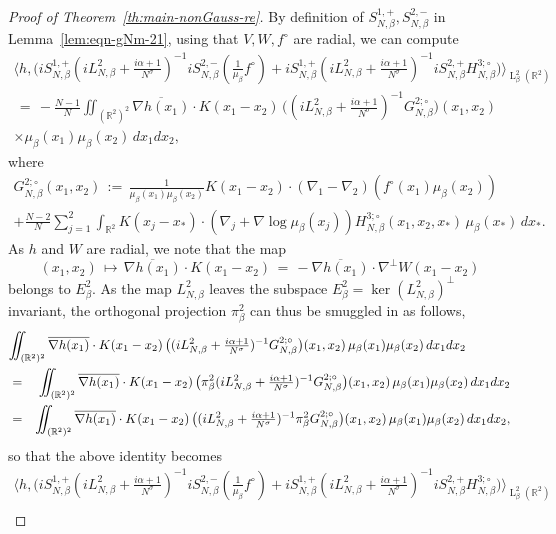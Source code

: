 \documentclass[a4paper,11pt,reqno,noindent]{amsart}
\theoremstyle{plain}
\numberwithin{equation}{section}
\newcommand{\R}{\mathbb R}
\newcommand{\3}{|\!|\!|}
\newcommand{\Ld}{\operatorname{L}}
\begin{document}
\begin{proof}[Proof of Theorem~\ref{th:main-nonGauss-re}]
\medskip\noindent
By definition of $S_{N,\beta}^{1,+},S_{N,\beta}^{2,-}$ in Lemma~\ref{lem:eqn-gNm-21}, using that $V,W,f^\circ$ are radial, we can compute
\begin{multline*}
\Big\langle h,\Big(iS_{N,\beta}^{1,+}(iL_{N,\beta}^2+\tfrac{i\alpha+1}{N^\sigma})^{-1}iS_{N,\beta}^{2,-}(\tfrac1{\mu_\beta}f^\circ) +iS_{N,\beta}^{1,+}(iL_{N,\beta}^2+\tfrac{i\alpha+1}{N^\sigma})^{-1}iS_{N,\beta}^{2,+}H_{N,\beta}^{3;\circ}\Big)\Big\rangle_{\Ld^2_\beta(\R^2)}\\
\,=\,-\tfrac{N-1}N\iint_{(\R^2)^2}\overline{\nabla h(x_1)}\cdot K(x_1-x_2)\,\big((iL_{N,\beta}^2+\tfrac{i\alpha+1}{N^\sigma})^{-1}G_{N,\beta}^{2;\circ}\big)(x_1,x_2)\\
\times\mu_\beta(x_1)\mu_\beta(x_2)\, dx_1dx_2,
\end{multline*}
where
\begin{multline*}
G_{N,\beta}^{2;\circ}(x_1,x_2)\,:=\,\tfrac{1}{\mu_\beta(x_1)\mu_\beta(x_2)}K(x_1-x_2)\cdot(\nabla_1-\nabla_2)(f^\circ(x_1)\mu_\beta(x_2))\\
+\tfrac{N-2}N\sum_{j=1}^2\int_{\R^2}K(x_j-x_*)\cdot(\nabla_j+\nabla\log\mu_\beta(x_j))H_{N,\beta}^{3;\circ}(x_1,x_2,x_*)\,\mu_\beta(x_*)\,dx_*.
\end{multline*}
As $h$ and $W$ are radial, we note that the map
\[(x_1,x_2)\,\mapsto\, \overline{\nabla h(x_1)}\cdot K(x_1-x_2)\,=\,- \overline{\nabla h(x_1)}\cdot \nabla^\bot W(x_1-x_2)\]
belongs to $E_\beta^2$. {As the map $L_{N,\beta}^2$ leaves the subspace $E_\beta^2=\ker(L_{N,\beta}^2)^\bot$ invariant, the orthogonal projection $\pi_\beta^2$ can thus be smuggled in as follows,
\begin{eqnarray*}
\lefteqn{\iint_{(\R^2)^2}\overline{\nabla h(x_1)}\cdot K(x_1-x_2)\,\big((iL_{N,\beta}^2+\tfrac{i\alpha+1}{N^\sigma})^{-1}G_{N,\beta}^{2;\circ}\big)(x_1,x_2)\,\mu_\beta(x_1)\mu_\beta(x_2)\, dx_1dx_2}\\
&=&\iint_{(\R^2)^2}\overline{\nabla h(x_1)}\cdot K(x_1-x_2)\,\big(\pi^2_\beta(iL_{N,\beta}^2+\tfrac{i\alpha+1}{N^\sigma})^{-1}G_{N,\beta}^{2;\circ}\big)(x_1,x_2)\,\mu_\beta(x_1)\mu_\beta(x_2)\, dx_1dx_2\\
&=&\iint_{(\R^2)^2}\overline{\nabla h(x_1)}\cdot K(x_1-x_2)\,\big((iL_{N,\beta}^2+\tfrac{i\alpha+1}{N^\sigma})^{-1}\pi^2_\beta G_{N,\beta}^{2;\circ}\big)(x_1,x_2)\,\mu_\beta(x_1)\mu_\beta(x_2)\, dx_1dx_2,
\end{eqnarray*}
so that the above identity becomes}
\begin{multline}\label{eq:pre-lim-mainterms-noGauss}
\Big\langle h,\Big(iS_{N,\beta}^{1,+}(iL_{N,\beta}^2+\tfrac{i\alpha+1}{N^\sigma})^{-1}iS_{N,\beta}^{2,-}(\tfrac1{\mu_\beta}f^\circ) +iS_{N,\beta}^{1,+}(iL_{N,\beta}^2+\tfrac{i\alpha+1}{N^\sigma})^{-1}iS_{N,\beta}^{2,+}H_{N,\beta}^{3;\circ}\Big)\Big\rangle_{\Ld^2_\beta(\R^2)}\\

\end{multline}
\end{proof}
\end{document}
